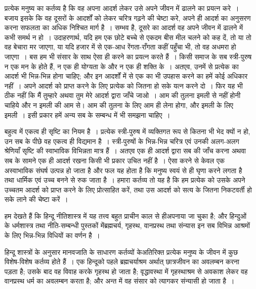 प्रत्येक मनुष्य का कर्तव्य है कि वह अपना आदर्श लेकर उसे अपने जीवन में ढालने का प्रयत्न करे~। बजाय इसके कि वह दूसरों के आदर्शों को लेकर चरित्र गढ़ने की चेष्टा करे, अपने ही आदर्श का अनुसरण करना सफलता का अधिक निश्चित मार्ग है~। सम्भव है, दूसरे का आदर्श वह अपने जीवन में ढालने में कभी समर्थ न हो~। उदाहरणार्थ, यदि हम एक छोटे बच्चे से एकदम बीस मील चलने को कह दें, तो या तो वह बेचारा मर जाएगा, या यदि हजार में से एक-आध रेंगता-राँगता कहीं पहुँचा भी, तो वह अधमरा हो जाएगा~। बस हम भी संसार के साथ ऐसा ही करने का प्रयत्न करते हैं~। किसी समाज के सब स्त्री-पुरुष न एक मन के होते हैं, न एक ही योग्यता के और न एक ही शक्ति के~। अतएव, उनमें से प्रत्येक का आदर्श भी भिन्न-भिन्न होना चाहिए; और इन आदर्शों में से एक का भी उपहास करने का हमें कोई अधिकार नहीं~। अपने आदर्श को प्राप्त करने के लिए प्रत्येक को जितना हो सके यत्न करने दो~। फिर यह भी ठीक नहीं कि मैं तुम्हारे अथवा तुम मेरे आदर्श द्वारा जाँचे जाओ~। आम की तुलना इमली से नहीं होनी चाहिये और न इमली की आम से। आम की तुलना के लिए आम ही लेना होगा, और इमली के लिए इमली~। इसी प्रकार हमें अन्य सब के सम्बन्ध में भी समझना चाहिए~।

बहुत्व में एकत्व ही सृष्टि का नियम है~। प्रत्येक स्त्री-पुरुष में व्यक्तिगत रूप से कितना भी भेद क्यों न हो, उन सब के पीछे वह एकत्व ही विद्यमान है~। स्त्री-पुरुषों के भिन्न-भिन्न चरित्र एवं उनकी अलग-अलग श्रेणियाँ सृष्टि की स्वाभाविक विभिन्नता मात्र हैं~। अतएव एक ही आदर्श द्वारा सब की जाँच करना अथवा सब के सामने एक ही आदर्श रखना किसी भी प्रकार उचित नहीं है~। ऐसा करने से केवल एक अस्वाभाविक संघर्ष उत्पन्न हो जाता है और फल यह होता है कि मनुष्य स्वयं से ही घृणा करने लगता है तथा धार्मिक एवं उच्च बनने से रुक जाता है~। हमारा कर्तव्य तो यह है कि हम प्रत्येक को उसके अपने उच्चतम आदर्श को प्राप्त करने के लिए प्रोत्साहित करें, तथा उस आदर्श को सत्य के जितना निकटवर्ती हो सके लाने की चेष्टा करें~।

हम देखते हैं कि हिन्दू नीतिशास्त्र में यह तत्त्व बहुत प्राचीन काल से ही\break अपनाया जा चुका है; और हिन्दुओं के धर्मशास्त्र तथा नीति-सम्बन्धी पुस्तकों में\break ब्रह्मचर्य, गृहस्थ, वानप्रस्थ तथा संन्यास इन सब विभिन्न आश्रमों के लिए भिन्न-भिन्न विधियों का वर्णन है~।

हिन्दू शास्त्रों के अनुसार मानवजाति के साधारण कर्तव्यों के\break अतिरिक्त प्रत्येक मनुष्य के जीवन में कुछ विशेष-विशेष कर्तव्य होते हैं~। एक हिन्दू\break को पहले ब्रह्मचर्याश्रम अर्थात् छात्रजीवन का अवलम्बन करना पड़ता है; उसके बाद वह विवाह करके गृहस्थ हो जाता है; वृद्धावस्था में गृहस्थाश्रम से अवकाश लेकर वह वानप्रस्थ धर्म का अवलम्बन करता है; और अन्त में वह संसार को त्यागकर संन्यासी हो जाता है~।

